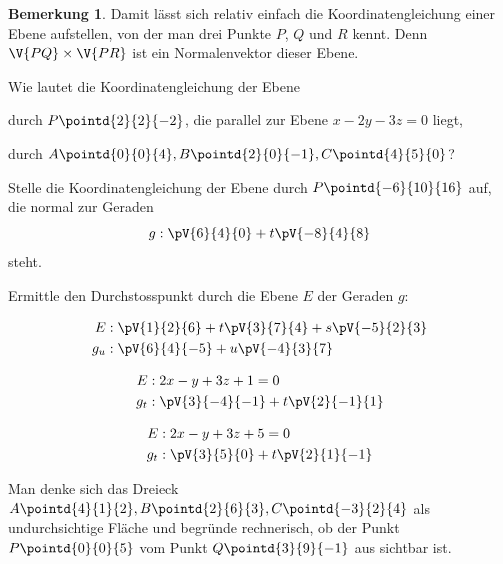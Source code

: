 \documentclass[%
11pt,%
twoside,%
titlepage,%
german,%
headsepline%
]{scrartcl}
\theoremstyle{definition}
\newtheorem{bem}{Bemerkung}[subsection] %
\theoremstyle{plain}
\begin{document}
\begin{bem}
Damit lässt sich relativ einfach die Koordinatengleichung einer Ebene aufstellen, von der man drei Punkte $P$, $Q$ und $R$ kennt. Denn $\V{PQ}\times\V{PR}$ ist ein Normalenvektor dieser Ebene.
\end{bem}

\begin{ueb}
Wie
lautet die Koordinatengleichung der Ebene
\begin{enumeratea}
\item durch $P\pointd{2}{ 2}{-2}$, die parallel zur Ebene $x- 2y- 3z=0$ liegt,
\item durch $A\pointd{0}{0}{4}, B\pointd{2}{0}{-1}, C\pointd{4}{5}{0}$?
\end{enumeratea}
\end{ueb}

\begin{ueb}[Koordinatengleichung]
Stelle die Koordinatengleichung der Ebene durch
 $P\pointd{-6}{10}{16}$ auf, die normal zur Geraden
$$g:\pV{6}{4}{0}+t\pV{-8}{4}{8}$$
steht.
\end{ueb}

\begin{ueb}[Durchstosspunkt]
Ermittle den Durchstosspunkt durch die Ebene $E$ der Geraden $g$:
\begin{enumeratea}
\item \begin{align*}E&:\pV{1}{2}{6}+t\pV{3}{7}{4}+s\pV{-5}{2}{3}\\g_u&:\pV{6}{4}{-5}+u\pV{-4}{3}{7}\end{align*}
\item \begin{align*}E&:2x-y+3z+1=0\\ g_t&:\pV{3}{-4}{-1}+t\pV{2}{-1}{1}\end{align*}
\item \begin{align*}E&:2x-y+3z+5=0\\ g_t&:\pV{3}{5}{0}+t\pV{2}{1}{-1}\end{align*}
\end{enumeratea}
\end{ueb}

\begin{ueb}[sichtbar?]
Man denke sich das Dreieck $A\pointd{4}{1}{2}, B\pointd{2}{6}{3}, C\pointd{-3}{2}{4}$ als undurchsichtige Fläche und begründe rechnerisch, ob der Punkt $P\pointd{0}{0}{5}$ vom Punkt $Q\pointd{3}{9}{-1}$ aus sichtbar ist.
\end{ueb}
\end{document}
